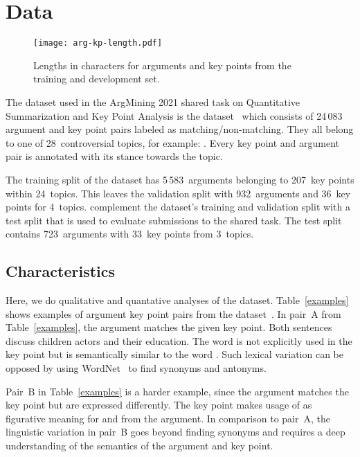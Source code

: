 \section{Data}\label{data}

\begin{figure*}
    \centering
    \texttt{[image: arg-kp-length.pdf]}
    \caption{Lengths in characters for arguments and key points from the training and development set.}
    \label{arg-kp-length}
\end{figure*}

The dataset used in the ArgMining 2021 shared task on Quantitative Summarization and Key Point Analysis is the \ArgKP dataset~\cite{Bar-HaimEFKLS2020} which consists of 24\,083 argument 
and key point pairs labeled as matching/non-matching. They all belong to one of 28~controversial topics, for example: 
. Every key point and argument pair is annotated with its stance towards the topic. 

The training split of the \ArgKP dataset has 5\,583~arguments belonging to 207~key points within 24~topics. This leaves the validation split with 932~arguments and 36~key points for 4~topics.
\citet{kpa-2021-overview} complement the \ArgKP dataset's training and validation split with a test split that is used to evaluate submissions to the shared task. The test split contains 723~arguments with 33~key points from 3~topics.

\subsection{Characteristics}

Here, we do qualitative and quantative analyses of the \ArgKP dataset. Table~\ref{examples} shows examples of argument key point pairs from the \ArgKP dataset~\cite{Bar-HaimEFKLS2020}. 
In pair~A from Table~\ref{examples}, the argument matches the given key point. Both sentences discuss 
children actors and their education. The word  is not explicitly used in the key point but is 
semantically similar to the word . 
Such lexical variation can be opposed by using WordNet~\cite{Miller1995} to find synonyms and antonyms.

Pair~B in Table~\ref{examples} is a harder example, since the argument matches the key point but are expressed differently. 
The key point makes usage of  as figurative meaning for  and  from the argument.
In comparison to pair~A, the linguistic variation in pair~B goes beyond finding synonyms and requires a deep understanding of the semantics of the argument and key point.

